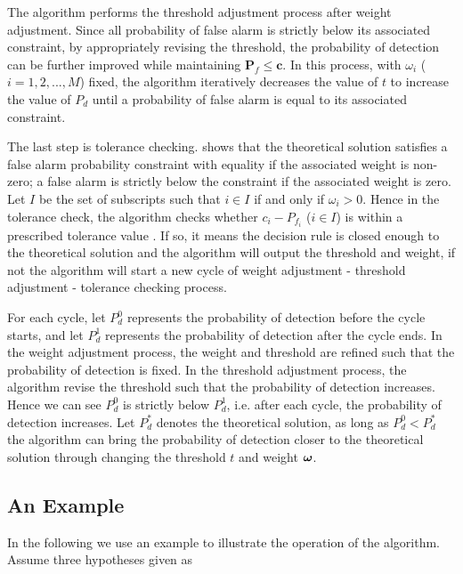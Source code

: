  The algorithm performs the threshold adjustment process after weight adjustment. Since all probability of false alarm is strictly below its associated constraint, by appropriately revising the threshold, the probability of detection can be further improved while maintaining $\mathbf{P}_f \leq \mathbf{c}$. In this process, with $\omega_i$ ($i=1, 2, ..., M$) fixed, the algorithm iteratively decreases the value of $t$ to increase the value of $P_d$ until a probability of false alarm is equal to its associated constraint.  

The last step is tolerance checking. \cite{zhang2000efficient} shows that the theoretical solution satisfies a false alarm probability constraint with equality if the associated weight is non-zero; a false alarm is strictly below the constraint if the associated weight is zero. 
Let $I$ be the set of subscripts such that $i \in I$ if and only if $\omega_i > 0$. 
Hence in the tolerance check, the algorithm checks whether $c_i - P_{f_i}$ ($i \in I$) is within a prescribed tolerance value . If so, it means the decision rule is closed enough to the theoretical solution and the algorithm will output the threshold and weight, if not the algorithm will start a new cycle of weight adjustment - threshold adjustment - tolerance checking process. 

For each cycle, let $P_d^0$ represents the probability of detection before the cycle starts, and let $P_d^1$ represents the probability of detection after the cycle ends. In the weight adjustment process, the weight and threshold are refined such that the probability of detection is fixed. In the threshold adjustment process, the algorithm revise the threshold such that the probability of detection increases. Hence we can see $P_d^0$ is strictly below $P_d^1$, i.e. after each cycle, the probability of detection increases. Let $P_d^\ast$ denotes the theoretical solution, as long as $P_d^0 < P_d^\ast$  the algorithm can bring the probability of detection closer to the theoretical solution  through changing the threshold $t$ and weight $\boldsymbol{\omega}$.

\subsection{An Example}
In the following we use an example to illustrate the operation of the algorithm. Assume three hypotheses given as

